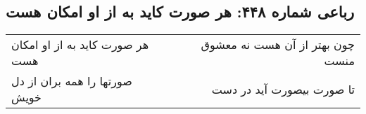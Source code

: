 \begin{center}
\section*{رباعی شماره ۴۴۸: هر صورت کاید به از او امکان هست}
\label{sec:0448}
\begin{longtable}{l p{0.5cm} r}
هر صورت کاید به از او امکان هست
&&
چون بهتر از آن هست نه معشوق منست
\\
صورتها را همه بران از دل خویش
&&
تا صورت بیصورت آید در دست
\\
\end{longtable}
\end{center}
